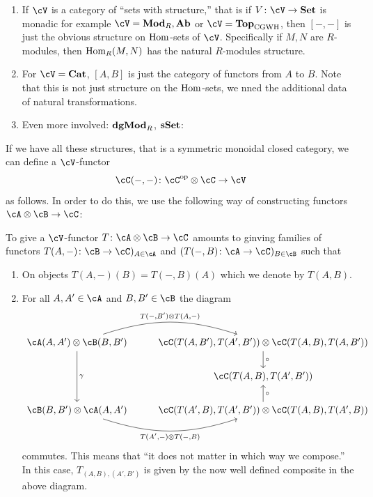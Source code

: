 \documentclass[a4paper,11pt,oneside,openany]{scrbook}
\begin{document}
\begin{exmp}
	\begin{enumerate}[label=\arabic*)]
		\item
		      If $ \cV $ is a category of ``sets with structure,'' that is if $ V \from \cV \to \Set $ is monadic for example $ \cV = \Mod_R,\Ab $ or $ \cV = \Top_{\mathrm{CGWH}} $, then $ [-,-] $ is just the obvious structure on $ \operatorname{\text{Hom}} $-sets of $ \cV $.
		      Specifically if $ M,N $ are $ R $-modules, then $ \operatorname{\text{Hom}}_R(M,N) $ has the natural $ R $-modules structure.
		\item
		      For $ \cV = \Cat $, $ [A,B] $ is just the category of functors from $ A $ to $ B $. Note that this is not just structure on the $ \operatorname{\text{Hom}} $-sets, we nned the additional data of natural transformations.
		\item Even more involved: $ {\normalfont\textbf{dgMod}}_R$, ${\normalfont\textbf{sSet}} $:
	\end{enumerate}
\end{exmp}
If we have all these structures, that is a symmetric monoidal closed category, we can define a $ \cV $-functor
\begin{displaymath}
	\cC(-,-) \from \cC^{\op}\otimes \cC \to \cV
\end{displaymath}
as follows.
In order to do this, we use the following way of constructing functors $ \cA\otimes \cB \to \cC $:
\begin{prop}
	To give a $ \cV $-functor $ T\from \cA \otimes \cB \to \cC $ amounts to ginving families of functors $ T(A,-)\from \cB \to \cC)_{A \in \cA} $ and $ (T(-,B) \from \cA \to \cC)_{B\in \cB} $ such that
	\begin{enumerate}[label=\roman*)]
		\item
		      On objects $ T(A,-)(B) = T(-,B)(A) $ which we denote by $ T(A,B) $.
		\item
		      For all $ A,A' \in \cA $ and $ B,B' \in \cB $ the diagram
		      \begin{displaymath}
			      \begin{tikzcd}%
				      \cA(A,A')\otimes \cB(B,B')
				      \arrow[r, "{T(-,B')\otimes T(A,-)}", bend left=18]
				      \arrow[dd, "\gamma"]
				      &
				      \cC(T(A,B') ,T(A',B')) \otimes \cC(T(A,B) ,T(A,B'))
				      \arrow[d, "\circ"]
				      \\
				      & \cC(T(A,B),T(A',B'))
				      \\
				      \cB(B,B') \otimes \cA(A,A')
				      \arrow[r, "{T(A',-)\otimes T(-,B)}"', bend right=18]
				      & \cC(T(A',B) ,T(A',B')) \otimes \cC(T(A,B) ,T(A',B))
				      \arrow[u, "\circ"']
			      \end{tikzcd}
		      \end{displaymath}
		      commutes.
		      This means that ``it does not matter in which way we compose.''
		      In this case, $ T_{(A,B),(A',B')}  $ is given by the now well defined composite in the above diagram.
	\end{enumerate}
\end{prop}
\end{document}
